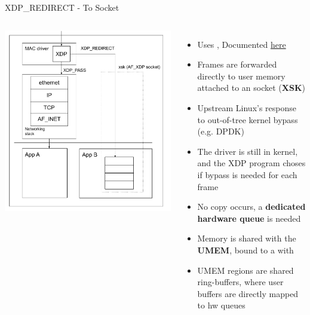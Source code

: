 \begin{frame}{XDP\_REDIRECT - To Socket}
	\begin{columns}
		\includegraphics[width=\textwidth]{slides/networking-ebpf-xdp/xdp_redirect_xskmap.pdf}
	\begin{itemize}
		\item Uses , Documented \href{https://docs.kernel.org/bpf/map_xskmap.html}{here}
		\item Frames are forwarded directly to user memory attached to an  socket (\textbf{XSK})
		\item Upstream Linux's response to out-of-tree kernel bypass (e.g. DPDK)
		\item The driver is still in kernel, and the XDP program choses if bypass is needed for each frame
		\item No copy occurs, a \textbf{dedicated hardware queue} is needed
		\item Memory is shared with the \textbf{UMEM}, bound to a  with 
		\item UMEM regions are shared ring-buffers, where user buffers are directly mapped to hw queues
	\end{itemize}
	\end{columns}
\end{frame}

